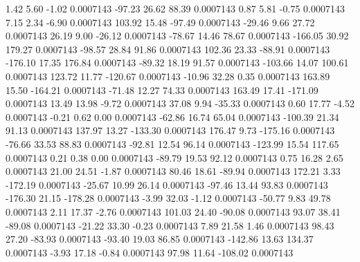         1.42        5.60       -1.02     0.0007143
      -97.23       26.62       88.39     0.0007143
        0.87        5.81       -0.75     0.0007143
        7.15        2.34       -6.90     0.0007143
      103.92       15.48      -97.49     0.0007143
      -29.46        9.66       27.72     0.0007143
       26.19        9.00      -26.12     0.0007143
      -78.67       14.46       78.67     0.0007143
     -166.05       30.92      179.27     0.0007143
      -98.57       28.84       91.86     0.0007143
      102.36       23.33      -88.91     0.0007143
     -176.10       17.35      176.84     0.0007143
      -89.32       18.19       91.57     0.0007143
     -103.66       14.07      100.61     0.0007143
      123.72       11.77     -120.67     0.0007143
      -10.96       32.28        0.35     0.0007143
      163.89       15.50     -164.21     0.0007143
      -71.48       12.27       74.33     0.0007143
      163.49       17.41     -171.09     0.0007143
       13.49       13.98       -9.72     0.0007143
       37.08        9.94      -35.33     0.0007143
        0.60       17.77       -4.52     0.0007143
       -0.21        0.62        0.00     0.0007143
      -62.86       16.74       65.04     0.0007143
     -100.39       21.34       91.13     0.0007143
      137.97       13.27     -133.30     0.0007143
      176.47        9.73     -175.16     0.0007143
      -76.66       33.53       88.83     0.0007143
      -92.81       12.54       96.14     0.0007143
     -123.99       15.54      117.65     0.0007143
        0.21        0.38        0.00     0.0007143
      -89.79       19.53       92.12     0.0007143
        0.75       16.28        2.65     0.0007143
       21.00       24.51       -1.87     0.0007143
       80.46       18.61      -89.94     0.0007143
      172.21        3.33     -172.19     0.0007143
      -25.67       10.99       26.14     0.0007143
      -97.46       13.44       93.83     0.0007143
     -176.30       21.15     -178.28     0.0007143
       -3.99       32.03       -1.12     0.0007143
      -50.77        9.83       49.78     0.0007143
        2.11       17.37       -2.76     0.0007143
      101.03       24.40      -90.08     0.0007143
       93.07       38.41      -89.08     0.0007143
      -21.22       33.30       -0.23     0.0007143
        7.89       21.58        1.46     0.0007143
       98.43       27.20      -83.93     0.0007143
      -93.40       19.03       86.85     0.0007143
     -142.86       13.63      134.37     0.0007143
       -3.93       17.18       -0.84     0.0007143
       97.98       11.64     -108.02     0.0007143

